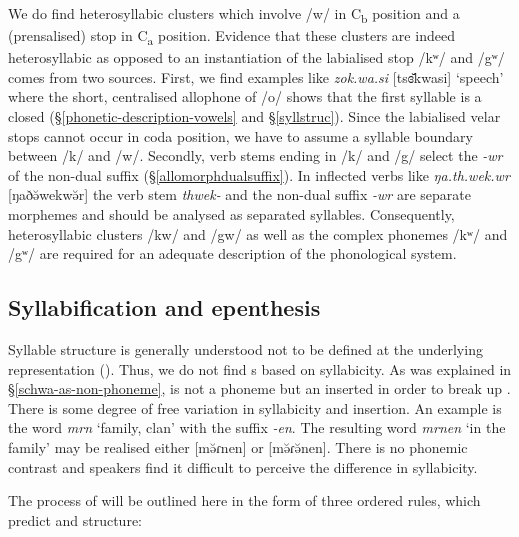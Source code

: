 We do find heterosyllabic clusters which involve /w/ in C\textsubscript{b} position and a  (prensalised) stop in  C\textsubscript{a} position. Evidence that these clusters are indeed heterosyllabic as opposed to an instantiation of the labialised  stop /kʷ/ and /{\ᵑ}gʷ/ comes from two sources. First, we find examples like \emph{zok.wa.si} [tsɞ̆kwasi] `speech' where the short, centralised allophone of /o/ shows that the first syllable is a closed  ({\S}\ref{phonetic-description-vowels} and {\S}\ref{syllstruc}). Since the labialised velar stops cannot occur in coda position, we have to assume a syllable boundary between /k/ and /w/. Secondly, verb stems ending in /k/ and /{\ᵑ}g/ select the \emph{-wr}  of the non-dual suffix ({\S}\ref{allomorphdualsuffix}). In inflected verbs like \emph{ŋa.th.wek.wr} [ŋaðə̆wekwə̆r] the verb stem \emph{thwek-} and the non-dual suffix \emph{-wr} are separate morphemes and should be analysed as separated syllables. Consequently, heterosyllabic clusters /kw/ and /{\ᵑ}gw/ as well as the complex phonemes /kʷ/ and /{\ᵑ}gʷ/ are required for an adequate description of the phonological system.

\subsection{Syllabification and epenthesis} \label{syllabificationandepenthesis}

Syllable structure is generally understood not to be defined at the underlying representation (\citealt[221]{Blevins:1995tt}). Thus, we do not find s based on syllabicity. As was explained in {\S}\ref{schwa-as-non-phoneme},  is not a phoneme but an  inserted in order to break up . There is some degree of free variation in syllabicity and  insertion. An example is the word \emph{mrn} `family, clan' with the  suffix \emph{-en}. The resulting word \emph{mrnen} `in the family' may be realised either [mə̆ɾnen] or [mə̆ɾə̆nen]. There is no phonemic contrast and speakers find it difficult to perceive the difference in syllabicity.

The process of  will be outlined here in the form of three ordered rules, which predict  and  structure:

